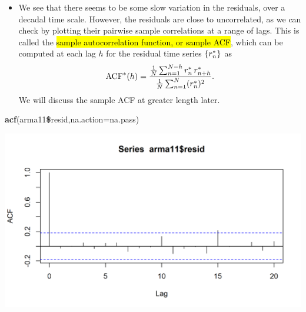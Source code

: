 \documentclass[]{article}
\newenvironment{Shaded}{\begin{snugshade}}{\end{snugshade}}
\newcommand{\KeywordTok}[1]{\textcolor[rgb]{0.13,0.29,0.53}{\textbf{#1}}}
\newcommand{\DataTypeTok}[1]{\textcolor[rgb]{0.13,0.29,0.53}{#1}}
\newcommand{\OperatorTok}[1]{\textcolor[rgb]{0.81,0.36,0.00}{\textbf{#1}}}
\newcommand{\NormalTok}[1]{#1}
\providecommand{\tightlist}{%
  \setlength{\itemsep}{0pt}\setlength{\parskip}{0pt}}
\begin{document}
\begin{itemize}
\tightlist
\item
  We see that there seems to be some slow variation in the residuals,
  over a decadal time scale. However, the residuals are close to
  uncorrelated, as we can check by plotting their pairwise sample
  correlations at a range of lags. This is called the \hl{sample
  autocorrelation function, or sample ACF}, which can be computed at each
  lag \(h\) for the residual time series \(\{r_n^*\}\) as
  \[ \mathrm{ACF}^*(h) = \frac{\frac{1}{N}\sum_{n=1}^{N-h} r_n^* \, r_{n+h}^*}
  {\frac{1}{N}\sum_{n=1}^{N} (r_{n}^*)^2}.\] We will discuss the
  sample ACF at greater length later.
\end{itemize}

\begin{Shaded}
\begin{Highlighting}[]
\KeywordTok{acf}\NormalTok{(arma11}\OperatorTok{\$}\NormalTok{resid,}\DataTypeTok{na.action=}\NormalTok{na.pass)}
\end{Highlighting}
\end{Shaded}

\begin{center}\includegraphics{figure/intro-acf-1} \end{center}
\end{document}
